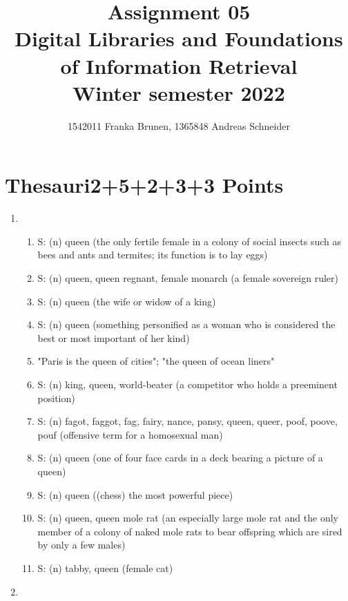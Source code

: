 \documentclass[10pt,a4paper]{article}
\title{ \vspace{-3em}
        Assignment 05\\
		\small{\bf Digital Libraries and Foundations of Information Retrieval}\\
		\small{Winter semester 2022}}
\author{\small{1542011 Franka Brunen}, \small{1365848 Andreas Schneider}}
\date{}
\begin{document}
\setlength{\parskip}{6pt} %
\setlength{\parindent}{0pt}

\leftskip=1cm\rightskip=0.5cm %

\maketitle


\section{\hfill Thesauri\hfill 2+5+2+3+3 Points}
\begin{enumerate}
    \item \begin{enumerate}
            \item S: (n) queen (the only fertile female in a colony of social insects such as bees and ants and termites; its function is to lay eggs)
            \item S: (n) queen, queen regnant, female monarch (a female sovereign ruler)
            \item S: (n) queen (the wife or widow of a king)
            \item S: (n) queen (something personified as a woman who is considered the best or most important of her kind)         \item "Paris is the queen of cities"; "the queen of ocean liners"
            \item S: (n) king, queen, world-beater (a competitor who holds a preeminent position)
            \item S: (n) fagot, faggot, fag, fairy, nance, pansy, queen, queer, poof, poove, pouf (offensive term for a homosexual man)
            \item S: (n) queen (one of four face cards in a deck bearing a picture of a queen)
            \item S: (n) queen ((chess) the most powerful piece)
            \item S: (n) queen, queen mole rat (an especially large mole rat and the only member of a colony of naked mole rats to bear offspring which are sired by only a few males)
            \item S: (n) tabby, queen (female cat) 
        \end{enumerate}
    \item \begin{enumerate}[label={(\arabic*)}]

\end{enumerate}
\end{enumerate}
\end{document}

